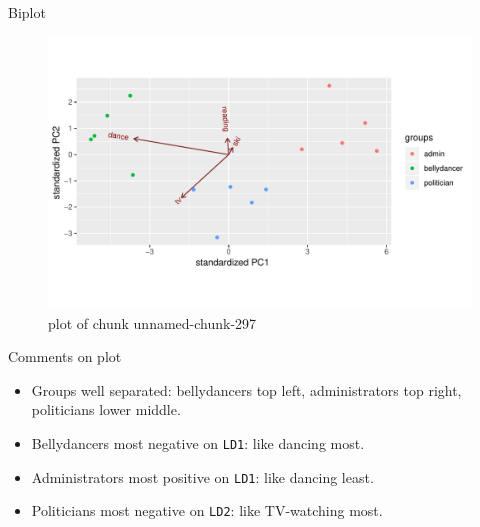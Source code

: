 \documentclass[ignorenonframetext,]{beamer}
\newenvironment{Shaded}{\begin{snugshade}}{\end{snugshade}}
\newcommand{\DataTypeTok}[1]{\textcolor[rgb]{0.13,0.29,0.53}{#1}}
\newcommand{\FloatTok}[1]{\textcolor[rgb]{0.00,0.00,0.81}{#1}}
\newcommand{\KeywordTok}[1]{\textcolor[rgb]{0.13,0.29,0.53}{\textbf{#1}}}
\newcommand{\NormalTok}[1]{#1}
\newcommand{\OperatorTok}[1]{\textcolor[rgb]{0.81,0.36,0.00}{\textbf{#1}}}
\begin{document}
\begin{frame}[fragile]{Biplot}
\protect\hypertarget{biplot}{}

\begin{Shaded}
\end{Shaded}

\begin{figure}
\centering
\includegraphics{figure/unnamed-chunk-297-1.pdf}
\caption{plot of chunk unnamed-chunk-297}
\end{figure}

\end{frame}

\begin{frame}[fragile]{Comments on plot}
\protect\hypertarget{comments-on-plot}{}

\begin{itemize}
\item
  Groups well separated: bellydancers top left, administrators top
  right, politicians lower middle.
\item
  Bellydancers most negative on \texttt{LD1}: like dancing most.
\item
  Administrators most positive on \texttt{LD1}: like dancing least.
\item
  Politicians most negative on \texttt{LD2}: like TV-watching most.
\end{itemize}

\end{frame}
\end{document}
